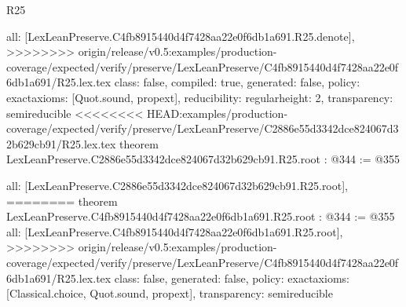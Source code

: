 \begin{lexlean}{R25}
\begin{coremodule}
{{{{{  all: [LexLeanPreserve.C4fb8915440d4f7428aa22e0f6db1a691.R25.denote],
>>>>>>>> origin/release/v0.5:examples/production-coverage/expected/verify/preserve/LexLeanPreserve/C4fb8915440d4f7428aa22e0f6db1a691/R25.lex.tex
  class: false,
  compiled: true,
  generated: false,
  policy: exact{axioms: [Quot.sound, propext]},
  reducibility: regular{height: 2},
  transparency: semireducible
}
<<<<<<<< HEAD:examples/production-coverage/expected/verify/preserve/LexLeanPreserve/C2886e55d3342dce824067d32b629cb91/R25.lex.tex
theorem LexLeanPreserve.C2886e55d3342dce824067d32b629cb91.R25.root : @344 := @355 {
  all: [LexLeanPreserve.C2886e55d3342dce824067d32b629cb91.R25.root],
========
theorem LexLeanPreserve.C4fb8915440d4f7428aa22e0f6db1a691.R25.root : @344 := @355 {
  all: [LexLeanPreserve.C4fb8915440d4f7428aa22e0f6db1a691.R25.root],
>>>>>>>> origin/release/v0.5:examples/production-coverage/expected/verify/preserve/LexLeanPreserve/C4fb8915440d4f7428aa22e0f6db1a691/R25.lex.tex
  class: false,
  generated: false,
  policy: exact{axioms: [Classical.choice, Quot.sound, propext]},
  transparency: semireducible
}

}}}}}
\end{coremodule}
\end{lexlean}
